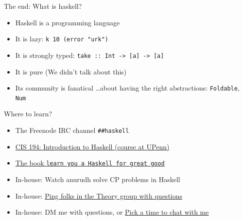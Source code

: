 \documentclass[8pt]{beamer}
\newcommand{\raw}[1]{\texttt{#1}}
\newcommand{\hs}[1]{\texttt{#1}}
\begin{document}
\begin{frame}[fragile]{The end: What is haskell?}
    \begin{itemize}
        \item Haskell is a programming language \pause
        \item It is lazy: \hs{k 10 (error "urk")} \pause
        \item It is strongly typed: \hs{take :: Int -> [a] -> [a]}\pause
        \item It is pure (We didn't talk about this)\pause
        \item Its community is fanatical \pause \dots  about having the right abstractions: \hs{Foldable}, \hs{Num} \pause
    \end{itemize}
    Where to learn?
    \begin{itemize}
        \item The Freenode IRC channel \raw{##haskell}\pause
        \item \href{https://www.seas.upenn.edu/~cis194/fall16/}{CIS 194: Introduction to Haskell (course at UPenn)} \pause
        \item \href{http://learnyouahaskell.com/}{The book \raw{learn you a Haskell for great good}} \pause
        \item In-house: Watch anurudh solve CP problems in Haskell\pause
        \item In-house: 
            \href{https://discord.com/invite/zK3a9n6?fbclid=IwAR1JaASmpgyc7T8w49E2aE-hr58ppwlr7QuZBK8Ssdk6Un9eXHYwUPm93-g}{Ping folks in the Theory group with questions}\pause
    \item In-house: DM me with questions, or \href{https://calendly.com/bollu/}{Pick a time to chat with me} \pause
    \end{itemize}
\end{frame}
\end{document}
